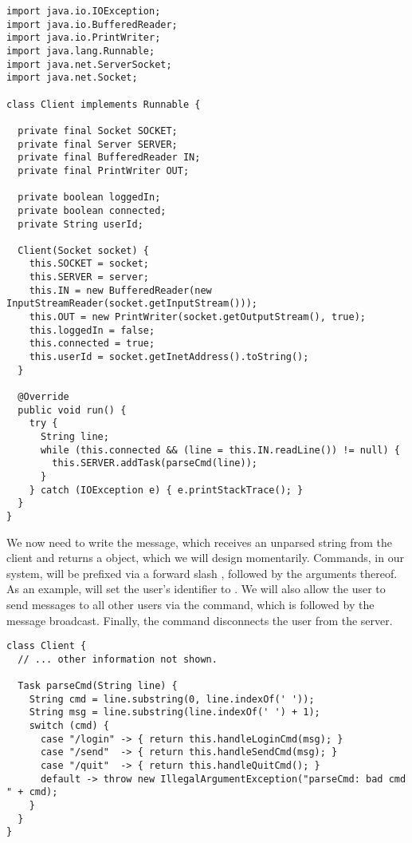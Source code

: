 \begin{lstlisting}[language=MyJava]
import java.io.IOException;
import java.io.BufferedReader;
import java.io.PrintWriter;
import java.lang.Runnable;
import java.net.ServerSocket;
import java.net.Socket;

class Client implements Runnable {

  private final Socket SOCKET;
  private final Server SERVER;
  private final BufferedReader IN;
  private final PrintWriter OUT;

  private boolean loggedIn;
  private boolean connected;
  private String userId;

  Client(Socket socket) {
    this.SOCKET = socket;
    this.SERVER = server;
    this.IN = new BufferedReader(new InputStreamReader(socket.getInputStream()));
    this.OUT = new PrintWriter(socket.getOutputStream(), true);
    this.loggedIn = false;
    this.connected = true;
    this.userId = socket.getInetAddress().toString();
  }

  @Override
  public void run() {
    try {
      String line;
      while (this.connected && (line = this.IN.readLine()) != null) { 
        this.SERVER.addTask(parseCmd(line)); 
      }
    } catch (IOException e) { e.printStackTrace(); }
  }
}
\end{lstlisting}

We now need to write the  message, which receives an unparsed string from the client and returns a  object, which we will design momentarily. Commands, in our system, will be prefixed via a forward slash \ttt{/}, followed by the arguments thereof. As an example,  will set the user's identifier to . We will also allow the user to send messages to all other users via the  command, which is followed by the message broadcast. Finally, the  command disconnects the user from the server.

\begin{lstlisting}[language=MyJava]
class Client {
  // ... other information not shown.

  Task parseCmd(String line) {
    String cmd = line.substring(0, line.indexOf(' '));
    String msg = line.substring(line.indexOf(' ') + 1);
    switch (cmd) {
      case "/login" -> { return this.handleLoginCmd(msg); }
      case "/send"  -> { return this.handleSendCmd(msg); }
      case "/quit"  -> { return this.handleQuitCmd(); }
      default -> throw new IllegalArgumentException("parseCmd: bad cmd " + cmd);
    }
  }
}
\end{lstlisting}

